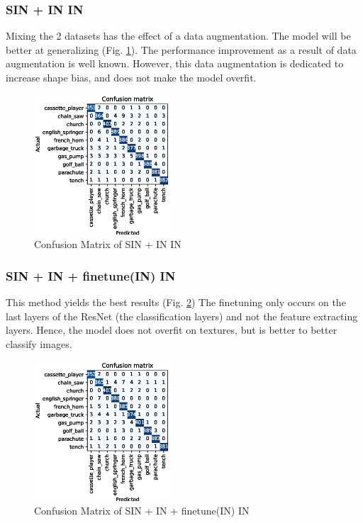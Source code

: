 \documentclass{article}
\begin{document}
\subsubsection{SIN + IN \texorpdfstring{\textrightarrow} .IN}

Mixing the 2 datasets has the effect of a data augmentation. The model will be better
at generalizing (Fig. \ref{cm_sinin-in}). The performance improvement as a result of data augmentation 
is well known. However, this data augmentation is dedicated to increase shape bias,
and does not make the model overfit.

\begin{figure}[h!]
  \includegraphics[width = 0.45\textwidth]{imgs/sinin/sinin-in_confusion_matrix_0.973.eps}
  \caption{Confusion Matrix of SIN + IN \texorpdfstring{\textrightarrow} .IN}
  \label{cm_sinin-in}
\end{figure}

\subsubsection{SIN + IN + finetune(IN) \texorpdfstring{\textrightarrow} .IN}

This method yields the best results (Fig. \ref{cm_sinin-in-finetune}) The finetuning only occurs
on the last layers of the ResNet (the classification layers) and not the feature extracting layers.
Hence, the model does not overfit on textures, but is better to better classify images.

\begin{figure}[h!]
  \includegraphics[width = 0.45\textwidth]{imgs/sinin/finetune/fine_tune_confusion_matrix_0.974.eps}
  \caption{Confusion Matrix of SIN + IN + finetune(IN) \texorpdfstring{\textrightarrow} .IN}
  \label{cm_sinin-in-finetune}
\end{figure}
\end{document}
